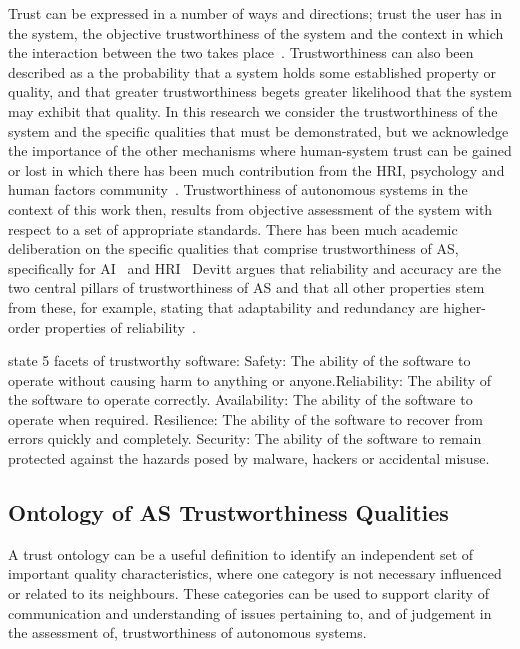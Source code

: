Trust can be expressed in a number of ways and directions; trust the user has in the system, the objective trustworthiness of the system and the context in which the interaction between the two takes place~\cite{Hancock2021}. 
%
Trustworthiness can also been described as a the probability that a system holds some established property or quality, and that greater trustworthiness begets greater likelihood that the system may exhibit that quality. 
%
In this research we consider the trustworthiness of the system and the specific qualities that must be demonstrated, but we acknowledge the importance of the other mechanisms where human-system trust can be gained or lost in which there has been much contribution from the HRI, psychology and human factors community~\cite{Floridi2019,Lee2004,kok2020trust,Chiou2021,Kohn2021,kraus2022trustworthy}. 
%
Trustworthiness of autonomous systems in the context of this work then, results from objective assessment of the system with respect to a set of appropriate standards. 
%
There has been much academic deliberation on the specific qualities that comprise trustworthiness of AS, specifically for AI~\cite{Thiebes2021,Wing2021} and HRI~\cite{kraus2022trustworthy,atkinson2012trust}
%
Devitt argues that reliability and accuracy are the two central pillars of trustworthiness of AS and that all other properties stem from these, for example, stating that adaptability and redundancy are higher-order properties of reliability~\cite{devitt2018trustworthiness}. 

\cite{ts_foundation} state 5 facets of trustworthy software: Safety: The ability of the software to operate without causing harm to anything or anyone.Reliability: The ability of the software to operate correctly. Availability: The ability of the software to operate when required.
Resilience: The ability of the software to recover from errors quickly and completely. Security: The ability of the software to remain protected against the hazards posed by malware, hackers or accidental misuse.



\subsection{Ontology of AS Trustworthiness Qualities}\label{sec:tasq-ont}

A trust ontology can be a useful definition to identify an independent set of important quality characteristics, where one category is not necessary influenced or related to its neighbours. These categories can be used to support clarity of communication and understanding of issues pertaining to, and of judgement in the assessment of, trustworthiness of autonomous systems. 

